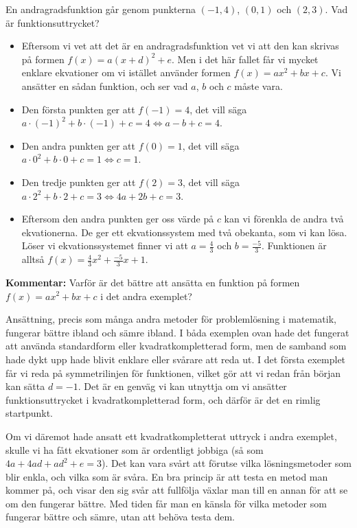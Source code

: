 En andragradsfunktion går genom punkterna $(-1, 4)$, $(0, 1)$ och $(2, 3)$. Vad är funktionsuttrycket?

\begin{itemize}
  \item Eftersom vi vet att det är en andragradsfunktion vet vi att den kan skrivas på formen $f(x)=a(x+d)^2+e$.
  Men i det här fallet får vi mycket enklare ekvationer om vi istället använder formen $f(x)=ax^2+bx+c$.
  Vi ansätter en sådan funktion, och ser vad $a$, $b$ och $c$ måste vara.
  \item Den första punkten ger att $f(-1)=4$, det vill säga $a \cdot (-1)^2+b \cdot (-1)+c=4 \Leftrightarrow a-b+c=4$.
  \item Den andra punkten ger att $f(0)=1$, det vill säga $a \cdot 0^2+b \cdot 0 +c=1\Leftrightarrow c=1$.
  \item Den tredje punkten ger att $f(2)=3$, det vill säga $a \cdot 2^2+b \cdot 2+c=3 \Leftrightarrow 4a+2b+c=3$.
  \item Eftersom den andra punkten ger oss värde på $c$ kan vi förenkla de andra två ekvationerna.
  De ger ett ekvationssystem med två obekanta, som vi kan lösa.
  Löser vi ekvationssystemet finner vi att $a=\frac{4}{3}$ och $b=\frac{-5}{3}$.
  Funktionen är alltså $f(x)=\frac{4}{3}x^2 +\frac{-5}{3}x + 1$.
\end{itemize}

\textbf{Kommentar:} Varför är det bättre att ansätta en funktion på formen $f(x)=ax^2+bx+c$ i det andra exemplet?

Ansättning, precis som många andra metoder för problemlösning i matematik, fungerar bättre ibland och sämre ibland.
I båda exemplen ovan hade det fungerat att använda standardform eller kvadratkompletterad form, men de samband som hade dykt upp hade blivit enklare eller svårare att reda ut.
I det första exemplet får vi reda på symmetrilinjen för funktionen, vilket gör att vi redan från början kan sätta $d=-1$.
Det är en genväg vi kan utnyttja om vi ansätter funktionsuttrycket i kvadratkompletterad form, och därför är det en rimlig startpunkt.

Om vi däremot hade ansatt ett kvadratkompletterat uttryck i andra exemplet, skulle vi ha fått ekvationer som är ordentligt jobbiga (så som $4a+4ad+ad^2+e=3$).
Det kan vara svårt att förutse vilka lösningsmetoder som blir enkla, och vilka som är svåra.
En bra princip är att testa en metod man kommer på, och visar den sig svår att fullfölja växlar man till en annan för att se om den fungerar bättre.
Med tiden får man en känsla för vilka metoder som fungerar bättre och sämre, utan att behöva testa dem.

